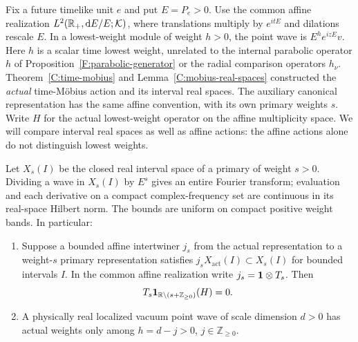 Fix a future timelike unit $e$ and put $E=P_e>0$.  Use the common affine
realization $L^2(\mathbb R_+,\mathrm d E/E;\mathcal K)$, where translations multiply
by $e^{itE}$ and dilations rescale $E$.  In a lowest-weight module of
weight $h>0$, the point wave is $E^h e^{izE}v$.  Here $h$ is a
scalar time lowest weight, unrelated to the internal parabolic operator
$h$ of Proposition~\ref{F:parabolic-generator} or the radial comparison
operators $h_\nu$.  Theorem~\ref{C:time-mobius} and
Lemma~\ref{C:mobius-real-spaces} constructed the \emph{actual}
time-M\"obius action and its interval real spaces.  The auxiliary
canonical representation has the same affine convention, with its own
primary weights $s$.  Write $H$ for the actual lowest-weight operator
on the affine multiplicity space.  We will compare interval real
spaces as well as affine actions: the affine actions alone do not
distinguish lowest weights.

\begin{lemma}
\label{E:paley-selection}
Let $X_s(I)$ be the closed real interval space of a primary of weight
$s>0$.  Dividing a wave in $X_s(I)$ by $E^s$ gives an entire Fourier
transform; evaluation and each derivative on a compact complex-frequency
set are continuous in its real-space Hilbert norm.  The bounds are
uniform on compact positive weight bands.  In particular:
\begin{enumerate}
\item Suppose a bounded affine intertwiner $j_s$ from the actual
representation to a weight-$s$ primary representation satisfies
$j_sX_{\mathrm{act}}(I)\subset X_s(I)$ for bounded intervals $I$.
In the common affine realization write $j_s=\mathbf 1\otimes T_s$.
Then
\[
 T_s\mathbf1_{\mathbb R\setminus(s+\mathbb Z_{\geq0})}(H)=0.
\]
\item A physically real localized vacuum point wave of scale dimension
$d>0$ has actual weights only among $h=d-j>0$,
$j\in\mathbb Z_{\geq0}$.
\end{enumerate}
\end{lemma}

